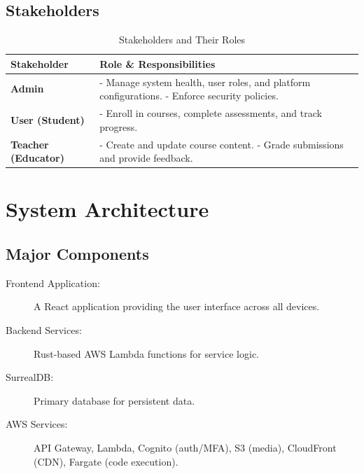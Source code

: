 \documentclass[a4paper, 11pt]{scrreprt}
\begin{document}
\section{Stakeholders}
\begin{table}[htbp]\setlength{\abovecaptionskip}{0pt}
    \centering
    \begin{tabularx}{\textwidth}{|l|X|}
        \hline
        \textbf{Stakeholder} & \textbf{Role \& Responsibilities} \\
        \hline
        \textbf{Admin} & - Manage system health, user roles, and platform configurations. \newline - Enforce security policies. \\
        \hline
        \textbf{User (Student)} & - Enroll in courses, complete assessments, and track progress. \\
        \hline
        \textbf{Teacher (Educator)} & - Create and update course content. \newline - Grade submissions and provide feedback. \\
        \hline
    \end{tabularx}
    \caption{Stakeholders and Their Roles}
\end{table}

\chapter{System Architecture}

\section{Major Components}

\begin{description}
    \item[Frontend Application:] A React application providing the user interface across all devices.
    \item[Backend Services:] Rust-based AWS Lambda functions for service logic.
    \item[SurrealDB:] Primary database for persistent data.
    \item[AWS Services:] API Gateway, Lambda, Cognito (auth/MFA), S3 (media), CloudFront (CDN), Fargate (code execution).
\end{description}
\end{document}
